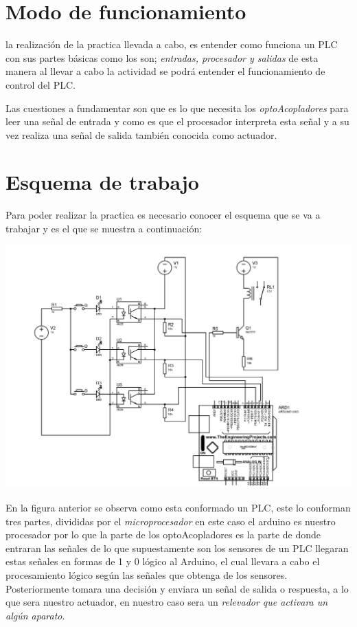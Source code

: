 \documentclass[11pt,a4paper]{article}
\begin{document}
\section{Modo de funcionamiento}
la realización de la practica llevada a cabo, es entender como funciona un PLC con sus partes básicas como los son; \emph{entradas, procesador y salidas} de esta manera al llevar a cabo la actividad se podrá entender el funcionamiento de control del PLC.

Las cuestiones a fundamentar son que es lo que necesita los \emph{optoAcopladores} para leer una señal de entrada y como es que el procesador interpreta esta señal y a su vez realiza una señal de salida también conocida como actuador.

\newpage

\section{Esquema de trabajo}
Para poder realizar la practica es necesario conocer el esquema que se va a trabajar y es el que se muestra a continuación:

\begin{center}
\includegraphics[scale=0.3]{2.jpeg}
\end{center}

En la figura anterior se observa como esta conformado un PLC, este lo conforman tres partes, divididas por el \emph{microprocesador} en este caso el arduino es nuestro procesador  por lo que la parte de los optoAcopladores es la parte de donde entraran las señales de lo que supuestamente son los sensores de un PLC llegaran estas señales en formas de 1 y 0 lógico al Arduino, el cual llevara a cabo el procesamiento lógico según las señales que obtenga de los sensores. Posteriormente tomara una decisión y enviara un señal de salida o respuesta, a lo que sera nuestro actuador, en nuestro caso sera un \emph{relevador que activara un algún aparato}. 
\end{document}
